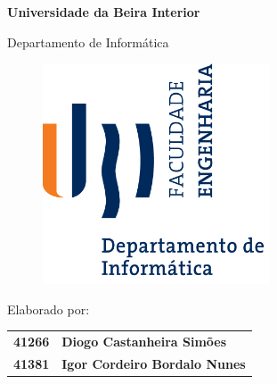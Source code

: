 \thispagestyle{empty}
\setcounter{page}{-1}

\begin{center}
\begin{Huge}
\textbf{Universidade da Beira Interior}
\end{Huge}
\end{center}

\begin{center}
\begin{Huge}
Departamento de Informática
\end{Huge}
\end{center}

\vspace{0,07cm}
\begin{figure}[!htb]
\centering
\includegraphics[width=191pt]{ubi-fe-di.png}
\end{figure}

\vspace{0.5cm}
\begin{center}
\begin{Large}
\textbf{\appname}
\end{Large}
\end{center}

\vspace{0.5cm}
\begin{center}
\begin{normalsize}
\begin{large}
Elaborado por:
\end{large}
\end{normalsize}
\end{center}

\vspace{0.2cm}
\begin{center}
\begin{large}
\begin{tabular}{>{\bfseries}r @{~~---~~} >{\bfseries}l}
	41266 & Diogo Castanheira Simões    \\
	41381 & Igor Cordeiro Bordalo Nunes
\end{tabular}
\end{large}
\end{center}

